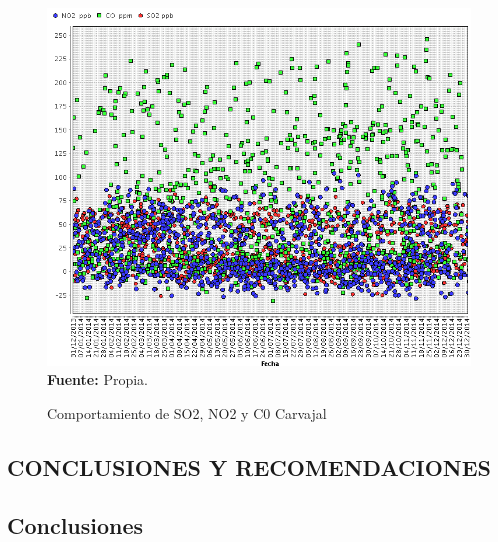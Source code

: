 \documentclass[a4paper,openright,12pt]{book}
\theoremstyle{definition}
\theoremstyle{remark}
\begin{document}
\begin{figure}[h]
\centering
\caption{Comportamiento de SO2, NO2 y C0 Carvajal} 
\includegraphics[scale=0.47]{Componentes/Carvajal_Componentes}
\label{fig:Tabla1}
\\ \textbf{Fuente: }Propia.
\end{figure}


\begin{center}
 \chapter{CONCLUSIONES Y RECOMENDACIONES}\label{cap.conclusiones}
\end{center}

\section{Conclusiones}
\end{document}
